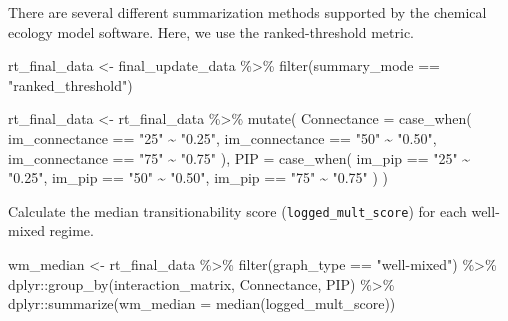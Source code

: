 \documentclass[
]{book}
\newenvironment{Shaded}{\begin{snugshade}}{\end{snugshade}}
\newcommand{\AttributeTok}[1]{\textcolor[rgb]{0.77,0.63,0.00}{#1}}
\newcommand{\FunctionTok}[1]{\textcolor[rgb]{0.00,0.00,0.00}{#1}}
\newcommand{\NormalTok}[1]{#1}
\newcommand{\OtherTok}[1]{\textcolor[rgb]{0.56,0.35,0.01}{#1}}
\newcommand{\SpecialCharTok}[1]{\textcolor[rgb]{0.00,0.00,0.00}{#1}}
\newcommand{\StringTok}[1]{\textcolor[rgb]{0.31,0.60,0.02}{#1}}
\begin{document}
There are several different summarization methods supported by the chemical ecology model software.
Here, we use the ranked-threshold metric.

\begin{Shaded}
\begin{Highlighting}[]
\NormalTok{rt\_final\_data }\OtherTok{\textless{}{-}}\NormalTok{ final\_update\_data }\SpecialCharTok{\%\textgreater{}\%}
  \FunctionTok{filter}\NormalTok{(summary\_mode }\SpecialCharTok{==} \StringTok{"ranked\_threshold"}\NormalTok{)}

\NormalTok{rt\_final\_data }\OtherTok{\textless{}{-}}\NormalTok{ rt\_final\_data }\SpecialCharTok{\%\textgreater{}\%}
  \FunctionTok{mutate}\NormalTok{(}
    \AttributeTok{Connectance =} \FunctionTok{case\_when}\NormalTok{(}
\NormalTok{      im\_connectance }\SpecialCharTok{==} \StringTok{"25"} \SpecialCharTok{\textasciitilde{}} \StringTok{"0.25"}\NormalTok{,}
\NormalTok{      im\_connectance }\SpecialCharTok{==} \StringTok{"50"} \SpecialCharTok{\textasciitilde{}} \StringTok{"0.50"}\NormalTok{,}
\NormalTok{      im\_connectance }\SpecialCharTok{==} \StringTok{"75"} \SpecialCharTok{\textasciitilde{}} \StringTok{"0.75"}
\NormalTok{    ),}
    \AttributeTok{PIP =} \FunctionTok{case\_when}\NormalTok{(}
\NormalTok{      im\_pip }\SpecialCharTok{==} \StringTok{"25"} \SpecialCharTok{\textasciitilde{}} \StringTok{"0.25"}\NormalTok{,}
\NormalTok{      im\_pip }\SpecialCharTok{==} \StringTok{"50"} \SpecialCharTok{\textasciitilde{}} \StringTok{"0.50"}\NormalTok{,}
\NormalTok{      im\_pip }\SpecialCharTok{==} \StringTok{"75"} \SpecialCharTok{\textasciitilde{}} \StringTok{"0.75"}
\NormalTok{    )}
\NormalTok{  )}
\end{Highlighting}
\end{Shaded}

Calculate the median transitionability score (\texttt{logged\_mult\_score}) for each well-mixed regime.

\begin{Shaded}
\begin{Highlighting}[]
\NormalTok{wm\_median }\OtherTok{\textless{}{-}}\NormalTok{ rt\_final\_data }\SpecialCharTok{\%\textgreater{}\%}
  \FunctionTok{filter}\NormalTok{(graph\_type }\SpecialCharTok{==} \StringTok{"well{-}mixed"}\NormalTok{) }\SpecialCharTok{\%\textgreater{}\%}
\NormalTok{  dplyr}\SpecialCharTok{::}\FunctionTok{group\_by}\NormalTok{(interaction\_matrix, Connectance, PIP) }\SpecialCharTok{\%\textgreater{}\%}
\NormalTok{  dplyr}\SpecialCharTok{::}\FunctionTok{summarize}\NormalTok{(}\AttributeTok{wm\_median =} \FunctionTok{median}\NormalTok{(logged\_mult\_score))}
\end{Highlighting}
\end{Shaded}
\end{document}
